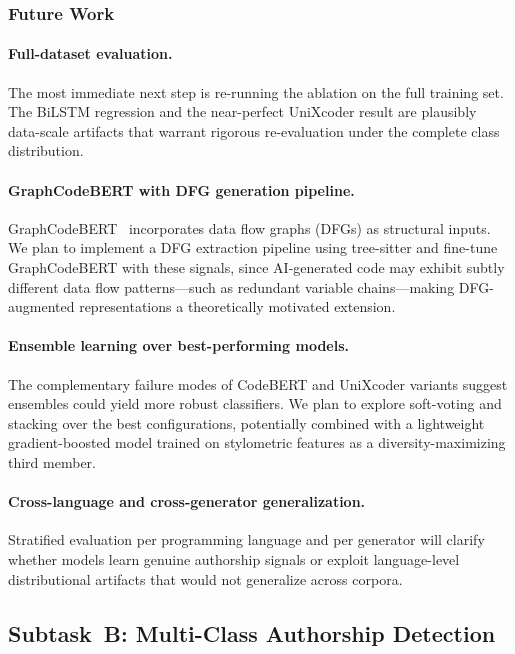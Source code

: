\documentclass[11pt]{article}
\begin{document}
\subsubsection{Future Work}

\paragraph{Full-dataset evaluation.}
The most immediate next step is re-running the ablation on the full training set. The BiLSTM regression and the near-perfect UniXcoder result are plausibly data-scale artifacts that warrant rigorous re-evaluation under the complete class distribution.

\paragraph{GraphCodeBERT with DFG generation pipeline.}
GraphCodeBERT~\cite{guo2021graphcodebert} incorporates data flow graphs (DFGs) as structural inputs. We plan to implement a DFG extraction pipeline using tree-sitter and fine-tune GraphCodeBERT with these signals, since AI-generated code may exhibit subtly different data flow patterns---such as redundant variable chains---making DFG-augmented representations a theoretically motivated extension.

\paragraph{Ensemble learning over best-performing models.}
The complementary failure modes of CodeBERT and UniXcoder variants suggest ensembles could yield more robust classifiers. We plan to explore soft-voting and stacking over the best configurations, potentially combined with a lightweight gradient-boosted model trained on stylometric features as a diversity-maximizing third member.

\paragraph{Cross-language and cross-generator generalization.}
Stratified evaluation per programming language and per generator will clarify whether models learn genuine authorship signals or exploit language-level distributional artifacts that would not generalize across corpora.

\subsection{Subtask~B: Multi-Class Authorship Detection}
\end{document}
